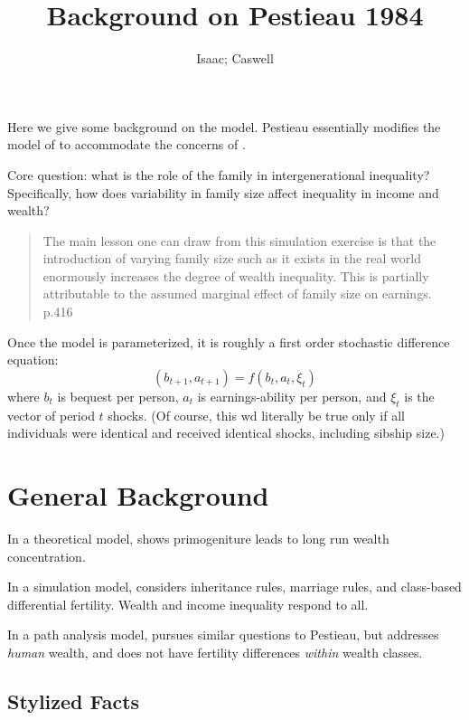 \documentclass{article}
\begin{document}
\author{Isaac; Caswell}
\title{Background on Pestieau 1984}
\maketitle

Here we give some background on the \citet{pestieau-1984-oep} model.
Pestieau essentially modifies the model of \cite{pryor-1973-aer} to accommodate the concerns of \citet{clague-1977-jhr}.

Core question: what is the role of the family in intergenerational inequality?
Specifically, how does variability in family size affect inequality in income and wealth?

\begin{quote}
The main lesson one can draw from this simulation exercise
is that the introduction of varying family size such as it exists in the real world
enormously increases the degree of wealth inequality.
This is partially attributable to the assumed marginal effect of family size on earnings.
\\
p.416
\end{quote}

Once the model is parameterized,
it is roughly a first order stochastic difference equation:
\begin{equation}
(b_{t+1}, a_{t+1}) = f(b_{t}, a_{t}, \xi_{t})
\end{equation}
where
$b_{t}$ is bequest per person,
$a_{t}$ is earnings-ability per person,
and
$\xi_{t}$ is the vector of period $t$ shocks.
(Of course, this wd literally be true only if all
individuals were identical and received identical shocks,
including sibship size.)


\section{General Background}

In a theoretical model,
\citet{stiglitz-1969-e} shows primogeniture leads to long run wealth concentration.

In a simulation model,
\citet{pryor-1973-aer} considers inheritance rules, marriage rules,
and class-based differential fertility.
Wealth and income inequality respond to all.

In a path analysis model,
\citet{clague-1977-jhr} pursues similar questions to Pestieau,
but addresses \emph{human} wealth,
and does not have fertility differences \emph{within} wealth classes.


\subsection{Stylized Facts}
\end{document}
